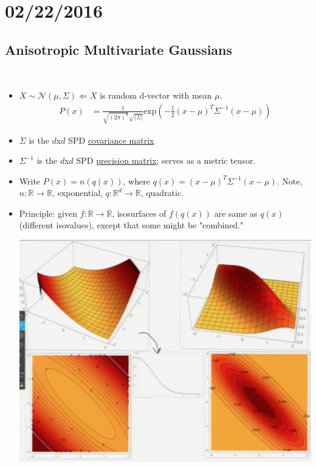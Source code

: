 \documentclass[10pt]{article}
\begin{document}
\newpage
\section*{02/22/2016}
	\subsection*{Anisotropic Multivariate Gaussians}
		\
		\begin{itemize}
			\item $X \sim \mathcal{N}(\mu, \Sigma) \Leftarrow X$ is random d-vector with mean $\mu$.
				\begin{align*}
					P(x) &= \frac{1}{\sqrt{(2\pi)^{d}}\sqrt{|\Sigma|}}\text{exp}(-\frac{1}{2}(x-\mu)^{T}\Sigma^{-1}(x-\mu))
				\end{align*}
			\item $\Sigma$ is the $d$x$d$ SPD \underline{covariance matrix}
			\item $\Sigma^{-1}$ is the $d$x$d$ SPD \underline{precision matrix}; serves as a metric tensor.
			\item Write $P(x) = n(q(x))$, where $q(x) = (x-\mu)^{T}\Sigma^{-1}(x-\mu)$. Note, $n: \mathbb{R} \rightarrow \mathbb{R}$, exponential, $q: \mathbb{R}^{d} \rightarrow \mathbb{R}$, quadratic.
			\item Principle: given $f: \mathbb{R} \rightarrow \mathbb{R}$, isosurfaces of $f(q(x))$ are same as $q(x)$ (different isovalues), except that some might be "combined."
				\begin{center}
					\includegraphics[scale=0.5]{images/gaussiantransformation}
				\end{center}

\end{itemize}
\end{document}
